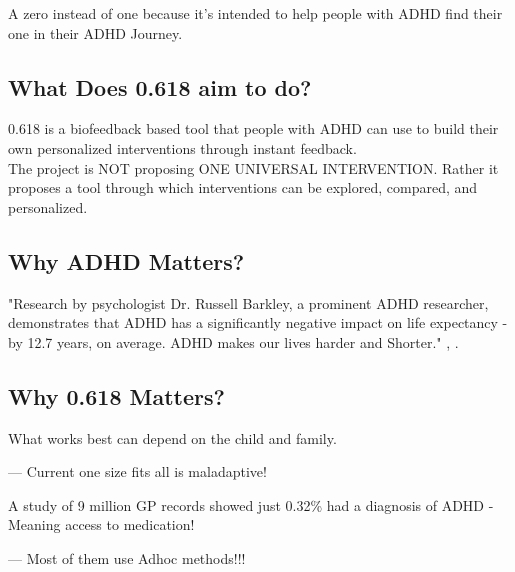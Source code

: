 \documentclass[
	fontsize=15pt,
	twoside=false,
	secnumdepth=2
]{kaobook}
\begin{document}
A zero instead of one because it's intended to help people with ADHD find their one in their ADHD Journey. \\ 

\subsection{What Does 0.618 aim to do?}

0.618 is a \textcolor{RoyalPurple}{biofeedback based tool} that people with ADHD can use to build their \textcolor{RoyalPurple}{own personalized interventions through instant feedback.} \\

The project is NOT proposing ONE UNIVERSAL INTERVENTION. Rather it proposes a tool through which interventions can be explored, compared, and personalized.  \\

\subsection{Why ADHD Matters?}

\begin{displayquote}
\textcolor{Sepia}{"Research by psychologist Dr. Russell Barkley, a prominent ADHD researcher, demonstrates that ADHD has a} \textcolor{RedOrange}{significantly negative impact on life expectancy - by  12.7 years}, on average. \textcolor{RoyalPurple}{ADHD makes our lives harder and Shorter}." , .
\end{displayquote}


\subsection{Why 0.618 Matters?}

\begin{displayquote}
What works best can depend on the child and family.  \\ 
\end{displayquote}
\hfill --- Current one size fits all is maladaptive! \\

\begin{displayquote} 
A study of 9 million GP records showed just 0.32\% had a diagnosis of ADHD - Meaning access to medication! 
\end{displayquote}
\hfill --- Most of them use Adhoc methods!!!  \\
\end{document}
